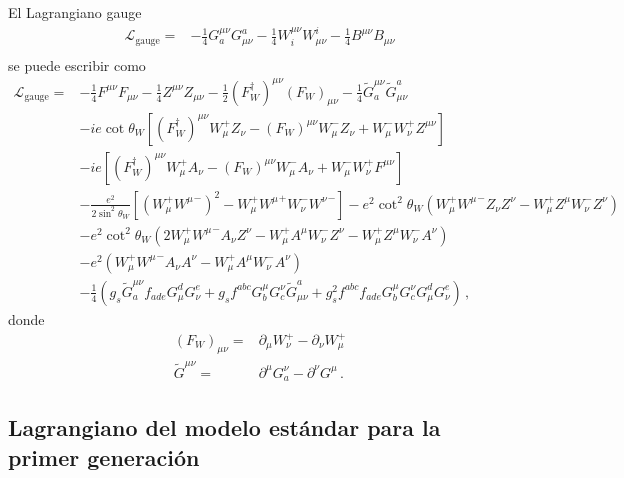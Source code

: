 \begin{frame}
El Lagrangiano gauge
\begin{align}
  \mathcal{L}_{\text{gauge}}=& -\tfrac{1}{4}G^{\mu\nu}_a G_{\mu\nu}^a-\tfrac{1}{4}W^{\mu\nu}_i W_{\mu\nu}^i-\tfrac{1}{4}B^{\mu\nu} B_{\mu\nu}\nonumber\\
\end{align}
se puede escribir como
\begin{align}
\label{eq:lgaguefin}
\mathcal{L}_{\text{gauge}}=&  -\tfrac{1}{4}F^{\mu\nu} F_{\mu\nu}-\tfrac{1}{4}Z^{\mu\nu} Z_{\mu\nu}-\tfrac{1}{2}(F_W^\dagger)^{\mu\nu} (F_W)_{\mu\nu}
- \tfrac{1}{4}\widetilde{G}^{\mu\nu}_a \widetilde{G}_{\mu\nu}^a\nonumber\\
&-ie\cot\theta_W\left[(F_W^\dagger)^{\mu\nu}W_\mu^+ Z_\nu-(F_W)^{\mu\nu}W_\mu^- Z_\nu+W_\mu^-W_\nu^+Z^{\mu\nu}\right]\nonumber\\
&-ie\left[(F_W^\dagger)^{\mu\nu}W_\mu^+ A_\nu-(F_W)^{\mu\nu}W_\mu^- A_\nu+W_\mu^-W_\nu^+F^{\mu\nu}\right]\nonumber\\
&-\frac{e^2}{2\sin^2\theta_W}\left[\left(W_\mu^+{W^\mu}^-\right)^2-W_\mu^+{W^\mu}^+W_\nu^-{W^\nu}^-\right]
-e^2\cot^2\theta_W\left(W_\mu^+{W^\mu}^-Z_\nu Z^\nu-W_\mu^+Z^\mu W_\nu^-Z^\nu\right)\nonumber\\
&-e^2\cot^2\theta_W\left(2W_\mu^+{W^\mu}^-A_\nu Z^\nu-W_\mu^+A^\mu W_\nu^-Z^\nu-W_\mu^+Z^\mu W_\nu^-A^\nu\right)\nonumber\\
&-e^2\left(W_\mu^+{W^\mu}^-A_\nu A^\nu-W_\mu^+A^\mu W_\nu^-A^\nu\right)\nonumber\\
&- \frac{1}{4}\left(g_s\widetilde{G}^{\mu\nu}_af_{a d e}G^d_\mu G^e_\nu
    +g_sf^{a b c}G_b^\mu G_c^\nu\widetilde{G}_{\mu\nu}^a
    +g_s^2f^{a b c}f_{a d e}G_b^\mu G_c^\nu G^d_\mu G^e_\nu\right)\,,
\end{align}
donde
\begin{align}
  (F_W)_{\mu\nu}=&\partial_\mu W^+_\nu-\partial_\nu W^+_\mu\nonumber\\
  \widetilde{G}^{\mu\nu}=&\partial^\mu G^\nu_a-\partial^\nu G^\mu\,.
\end{align}

\end{frame}
\subsection{Lagrangiano del modelo estándar para la primer generación}

